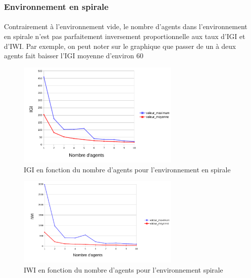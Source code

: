 \documentclass{article}
\begin{document}
        \subsubsection{Environnement en spirale}
        \paragraph{} Contrairement à l'environnement vide, le nombre d'agents dans l'environnement en spirale n'est pas parfaitement inversement proportionnelle aux taux d'IGI et d'IWI.
        Par exemple, on peut noter sur le graphique que passer de un à deux agents fait baisser l'IGI moyenne d'environ 60%
            \begin{figure}[!h]
                \begin{center}
                    \includegraphics[width = 0.7\textwidth]{graphes pdf/variance tortues IGI spirale.pdf}
                    \caption{IGI en fonction du nombre d'agents pour l'environnement en spirale}
                \end{center}
            \end{figure}
            \begin{figure}[!h]
                \begin{center}
                    \includegraphics[width = 0.7\textwidth]{graphes pdf/variance tortues IWI spirale.pdf}
                    \caption{IWI en fonction du nombre d'agents pour l'environnement spirale}
                \end{center}
            \end{figure}
            \newpage
\end{document}

